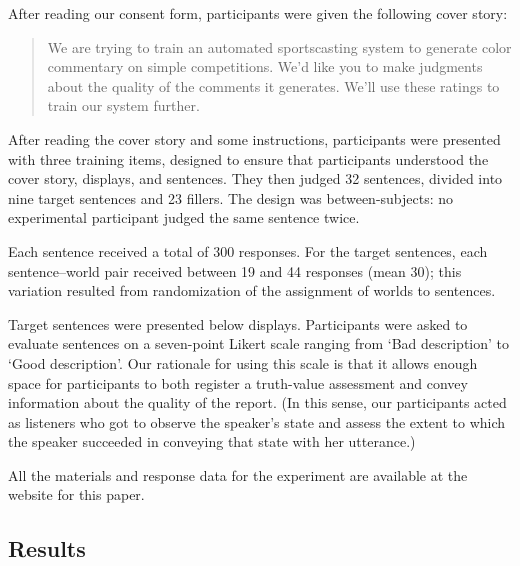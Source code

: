 \documentclass[leqno,12pt]{article}
\begin{document}
After reading our consent form, participants were given the following
cover story:

\begin{quote}
  We are trying to train an automated sportscasting system to generate
  color commentary on simple competitions. We'd like you to make
  judgments about the quality of the comments it generates. We'll use
  these ratings to train our system further.
\end{quote}

After reading the cover story and some instructions, participants were
presented with three training items, designed to ensure that participants
understood the cover story, displays, and sentences. They then judged 32
sentences, divided into nine target sentences and 23 fillers. The
design was between-subjects: no experimental participant judged the same sentence twice. 
 
Each sentence received a
total of 300 responses. For the target sentences, each sentence--world
pair received between 19 and 44 responses (mean 30); this variation
resulted from randomization of the assignment of worlds to sentences. 

Target sentences were presented below displays. Participants were
asked to evaluate sentences on a seven-point
Likert scale ranging from `Bad description' to `Good description'. Our
rationale for using this scale is that it allows enough space for
participants to both register a truth-value assessment and convey
information about the quality of the report. (In this sense, our
participants acted as listeners who got to observe the speaker's state
and assess the extent to which the speaker succeeded in conveying that
state with her utterance.)

All the materials and response data for the experiment are available at
the website for this paper.


\subsection{Results}\label{sec:exp1:results}

\end{document}
